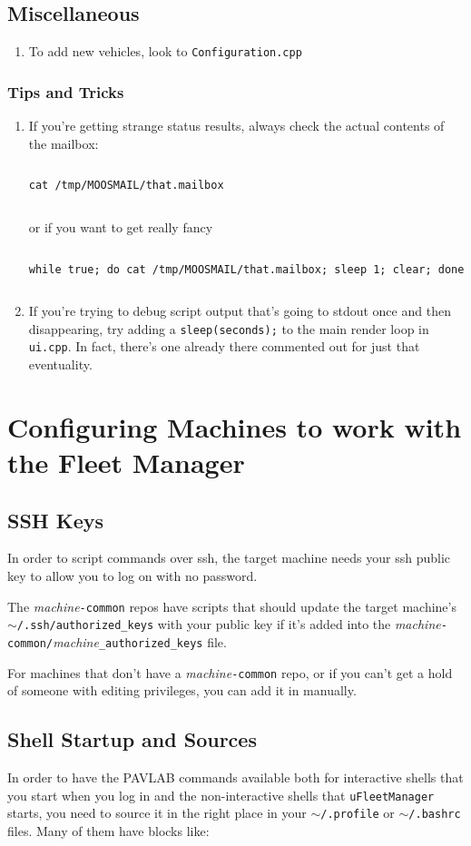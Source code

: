 \documentclass[11pt]{article}
\newcommand{\cmdline}[1]{\vspace{.2em} $\:$\\ \begin{minipage}{\dimexpr\textwidth-2cm}
\texttt{#1}
\end{minipage} $\:$\\ \vspace{-.2em} }
\begin{document}
\subsection{Miscellaneous}
\begin{enumerate}
\item To add new vehicles, look to \texttt{Configuration.cpp}
\end{enumerate}
\subsubsection{Tips and Tricks}
\begin{enumerate}
\item If you're getting strange status results, always check the actual contents of the mailbox:

\cmdline{cat /tmp/MOOSMAIL/that.mailbox}

or if you want to get really fancy

\cmdline{while true; do cat /tmp/MOOSMAIL/that.mailbox; sleep 1; clear; done}
\item If you're trying to debug script output that's going to stdout once and then disappearing, try adding a \texttt{sleep(seconds);} to the main render loop in \texttt{ui.cpp}. In fact, there's one already there commented out for just that eventuality. 
\end{enumerate}
\section{Configuring Machines to work with the Fleet Manager}
\subsection{SSH Keys}
In order to script commands over ssh, the target machine needs your ssh public key to allow you to log on with no password. 

The \textit{machine}\texttt{-common} repos have scripts that should update the target machine's \texttt{$\sim$/.ssh/authorized\_keys} with your public key if it's added into the \textit{machine}\texttt{-common/}\textit{machine}\texttt{\_authorized\_keys} file.

For machines that don't have a \textit{machine}\texttt{-common} repo, or if you can't get a hold of someone with editing privileges, you can add it in manually.
\subsection{Shell Startup and Sources}
In order to have the PAVLAB commands available both for interactive shells that you start when you log in and the non-interactive shells that \texttt{uFleetManager} starts, you need to source it in the right place in your \texttt{$\sim$/.profile} or \texttt{$\sim$/.bashrc} files. Many of them have blocks like:
\end{document}
